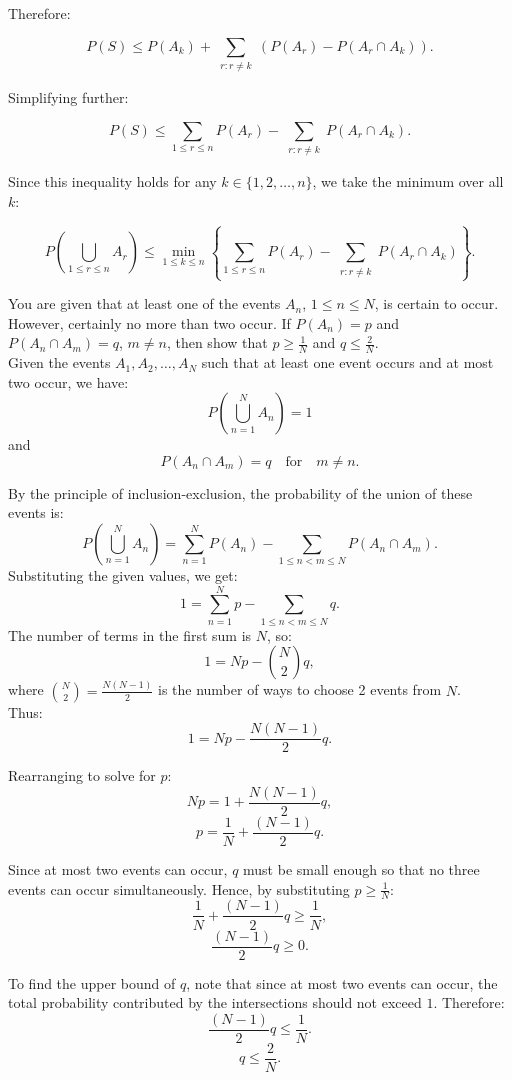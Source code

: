 \begin{example}
Therefore:

\[
P(S) \leq P(A_k) + \sum_{\substack{r: r \neq k}} \left(P(A_r) - P(A_r \cap A_k)\right).
\]

Simplifying further:

\[
P(S) \leq \sum_{1 \leq r \leq n} P(A_r) - \sum_{\substack{r: r \neq k}} P(A_r \cap A_k).
\]

Since this inequality holds for any $k \in \{1, 2, \ldots, n\}$, we take the minimum over all $k$:

\[
P\left(\bigcup_{1 \leq r \leq n} A_r\right) \leq \min_{1 \leq k \leq n} \left\{ \sum_{1 \leq r \leq n} P(A_r) - \sum_{\substack{r: r \neq k}} P(A_r \cap A_k) \right\}.
\]
\end{example}

\begin{example}
    You are given that at least one of the events $A_n$, $1 \leq n \leq N$, is certain to occur. However, certainly no more than two occur. If $P(A_n) = p$ and $P(A_n \cap A_m) = q$, $m \neq n$, then show that $p \geq \frac{1}{N}$ and $q \leq \frac{2}{N}$. \\

    Given the events $A_1, A_2, \ldots, A_N$ such that at least one event occurs and at most two occur, we have:
\[
P\left(\bigcup_{n=1}^{N} A_n\right) = 1
\]
and
\[
P\left(A_n \cap A_m\right) = q \quad \text{for} \quad m \neq n.
\]

By the principle of inclusion-exclusion, the probability of the union of these events is:
\[
P\left(\bigcup_{n=1}^{N} A_n\right) = \sum_{n=1}^{N} P(A_n) - \sum_{1 \leq n < m \leq N} P(A_n \cap A_m).
\]
Substituting the given values, we get:
\[
1 = \sum_{n=1}^{N} p - \sum_{1 \leq n < m \leq N} q.
\]
The number of terms in the first sum is $N$, so:
\[
1 = Np - \binom{N}{2}q,
\]
where $\binom{N}{2} = \frac{N(N-1)}{2}$ is the number of ways to choose 2 events from $N$.\\

Thus:
\[
1 = Np - \frac{N(N-1)}{2}q.
\]

Rearranging to solve for $p$:
\[
Np = 1 + \frac{N(N-1)}{2}q,
\]
\[
p = \frac{1}{N} + \frac{(N-1)}{2}q.
\]

Since at most two events can occur, $q$ must be small enough so that no three events can occur simultaneously. Hence, by substituting $p \geq \frac{1}{N}$:
\[
\frac{1}{N} + \frac{(N-1)}{2}q \geq \frac{1}{N},
\]
\[
\frac{(N-1)}{2}q \geq 0.
\]

To find the upper bound of $q$, note that since at most two events can occur, the total probability contributed by the intersections should not exceed $1$. Therefore:
\[
\frac{(N-1)}{2}q \leq \frac{1}{N}.
\]
\[
q \leq \frac{2}{N}.
\]

\end{example}

